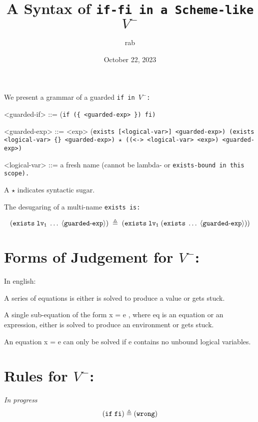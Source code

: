 \documentclass[]{article}
\title{A Syntax of \tt{if-fi} in a Scheme-like $V^{-}$}
\author{rab}
\date{October 22, 2023}
\newcommand{\solve}{\tt{<->}}
\begin{document}
\maketitle

We present a grammar of a guarded \tt{if} in $V^{-}$: 

\bigskip

\begin{grammar}
    <guarded-if> ::= (\tt{if}  (\{ <guarded-exp> \}) \tt{fi})

    <guarded-exp> ::= <exp>
    \alt  (\tt{exists} [<logical-var>] <guarded-exp>)
    \alt  (\tt{exists} <logical-var> \{<logical-var>\} <guarded-exp>) $\star$
    \alt  ((\solve \; <logical-var> <exp>) <guarded-exp>)

    <logical-var> ::= a fresh name (cannot be lambda- or \tt{exists}-bound in
    this scope).

\end{grammar}

A $\star$ indicates syntactic sugar. 

The desugaring of a multi-name \tt{exists}
is:


$$(\tt{exists} \; lv_1 \; \dots \; \langle guarded\textrm{-}exp \rangle) \;
\triangleq \; (\tt{exists} \; lv_1 \; (\tt{exists} \; \dots \; \langle
guarded\textrm{-}exp \rangle))  $$


\section{Forms of Judgement for $V^{-}$:}

In english: 

A series of equations is either is solved to produce a value or gets stuck. 

A single sub-equation of the form x = e , where eq is an equation or an
expression, either is solved to produce an environment or gets stuck. 

An equation x = e can only be solved if e contains no unbound logical variables. 


\section{Rules for $V^{-}$:}

\it{In progress}
$$
(\tt{if} \; \tt{fi}) \triangleq (\tt{wrong})
$$


\end{document}
